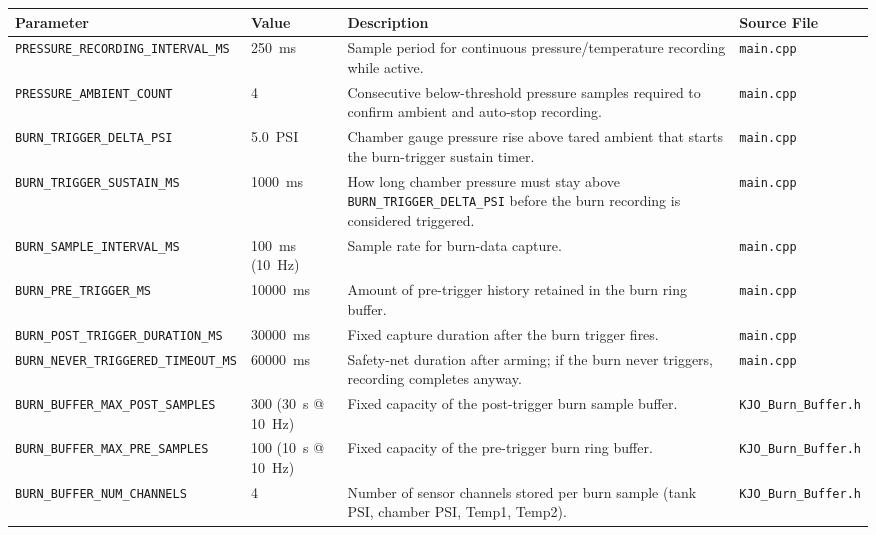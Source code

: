 ﻿\documentclass[11pt,letterpaper]{article}
\begin{document}
\begingroup
\footnotesize
\begin{longtable}{@{}p{3.2cm}p{2.4cm}p{6.2cm}p{2.6cm}@{}}
\toprule
Parameter & Value & Description & Source File \\
\midrule
\texttt{PRESSURE\_\allowbreak RECORDING\_\allowbreak INTERVAL\_\allowbreak MS} & 250~ms & Sample period for continuous pressure/temperature recording while active. & \texttt{main.cpp} \\
\texttt{PRESSURE\_\allowbreak AMBIENT\_\allowbreak COUNT} & 4 & Consecutive below-threshold pressure samples required to confirm ambient and auto-stop recording. & \texttt{main.cpp} \\
\texttt{BURN\_\allowbreak TRIGGER\_\allowbreak DELTA\_\allowbreak PSI} & 5.0~PSI & Chamber gauge pressure rise above tared ambient that starts the burn-trigger sustain timer. & \texttt{main.cpp} \\
\texttt{BURN\_\allowbreak TRIGGER\_\allowbreak SUSTAIN\_\allowbreak MS} & 1000~ms & How long chamber pressure must stay above \texttt{BURN\_\allowbreak TRIGGER\_\allowbreak DELTA\_\allowbreak PSI} before the burn recording is considered triggered. & \texttt{main.cpp} \\
\texttt{BURN\_\allowbreak SAMPLE\_\allowbreak INTERVAL\_\allowbreak MS} & 100~ms (10~Hz) & Sample rate for burn-data capture. & \texttt{main.cpp} \\
\texttt{BURN\_\allowbreak PRE\_\allowbreak TRIGGER\_\allowbreak MS} & 10000~ms & Amount of pre-trigger history retained in the burn ring buffer. & \texttt{main.cpp} \\
\texttt{BURN\_\allowbreak POST\_\allowbreak TRIGGER\_\allowbreak DURATION\_\allowbreak MS} & 30000~ms & Fixed capture duration after the burn trigger fires. & \texttt{main.cpp} \\
\texttt{BURN\_\allowbreak NEVER\_\allowbreak TRIGGERED\_\allowbreak TIMEOUT\_\allowbreak MS} & 60000~ms & Safety-net duration after arming; if the burn never triggers, recording completes anyway. & \texttt{main.cpp} \\
\texttt{BURN\_\allowbreak BUFFER\_\allowbreak MAX\_\allowbreak POST\_\allowbreak SAMPLES} & 300 (30~s @ 10~Hz) & Fixed capacity of the post-trigger burn sample buffer. & \texttt{KJO\_\allowbreak Burn\_\allowbreak Buffer.h} \\
\texttt{BURN\_\allowbreak BUFFER\_\allowbreak MAX\_\allowbreak PRE\_\allowbreak SAMPLES} & 100 (10~s @ 10~Hz) & Fixed capacity of the pre-trigger burn ring buffer. & \texttt{KJO\_\allowbreak Burn\_\allowbreak Buffer.h} \\
\texttt{BURN\_\allowbreak BUFFER\_\allowbreak NUM\_\allowbreak CHANNELS} & 4 & Number of sensor channels stored per burn sample (tank PSI, chamber PSI, Temp1, Temp2). & \texttt{KJO\_\allowbreak Burn\_\allowbreak Buffer.h} \\
\end{longtable}
\endgroup
\end{document}
